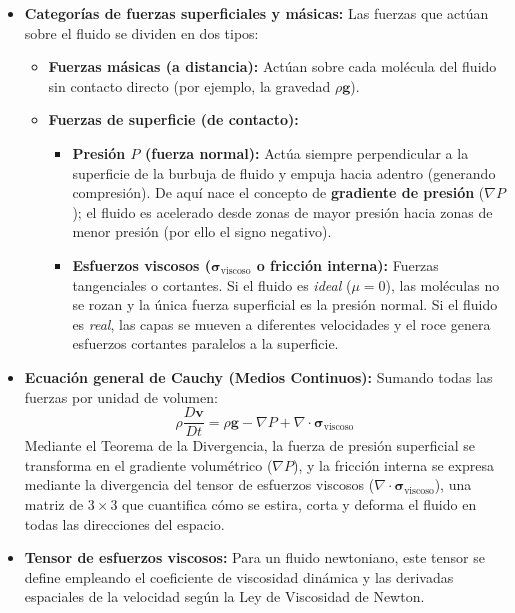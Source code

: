 \documentclass[11pt,letterpaper]{article}
\begin{document}
\begin{itemize}
    \item \textbf{Categorías de fuerzas superficiales y másicas:} Las fuerzas que actúan sobre el fluido se dividen en dos tipos:
    \begin{itemize}
        \item \textbf{Fuerzas másicas (a distancia):} Actúan sobre cada molécula del fluido sin contacto directo (por ejemplo, la gravedad $\rho \mathbf{g}$).
        \item \textbf{Fuerzas de superficie (de contacto):} 
        \begin{itemize}
            \item \textbf{Presión $P$ (fuerza normal):} Actúa siempre perpendicular a la superficie de la burbuja de fluido y empuja hacia adentro (generando compresión). De aquí nace el concepto de \textbf{gradiente de presión} ($\nabla P$); el fluido es acelerado desde zonas de mayor presión hacia zonas de menor presión (por ello el signo negativo).
            \item \textbf{Esfuerzos viscosos ($\boldsymbol{\sigma}_{\text{viscoso}}$ o fricción interna):} Fuerzas tangenciales o cortantes. Si el fluido es \textit{ideal} ($\mu = 0$), las moléculas no se rozan y la única fuerza superficial es la presión normal. Si el fluido es \textit{real}, las capas se mueven a diferentes velocidades y el roce genera esfuerzos cortantes paralelos a la superficie.
        \end{itemize}
    \end{itemize}

    \item \textbf{Ecuación general de Cauchy (Medios Continuos):} Sumando todas las fuerzas por unidad de volumen:
    \begin{equation}
        \rho \frac{D\mathbf{v}}{Dt} = \rho \mathbf{g} - \nabla P + \nabla \cdot \boldsymbol{\sigma}_{\text{viscoso}}
    \end{equation}
    Mediante el Teorema de la Divergencia, la fuerza de presión superficial se transforma en el gradiente volumétrico ($\nabla P$), y la fricción interna se expresa mediante la divergencia del tensor de esfuerzos viscosos ($\nabla \cdot \boldsymbol{\sigma}_{\text{viscoso}}$), una matriz de $3 \times 3$ que cuantifica cómo se estira, corta y deforma el fluido en todas las direcciones del espacio.

    \item \textbf{Tensor de esfuerzos viscosos:} Para un fluido newtoniano, este tensor se define empleando el coeficiente de viscosidad dinámica y las derivadas espaciales de la velocidad según la Ley de Viscosidad de Newton.
\end{itemize}
\end{document}
